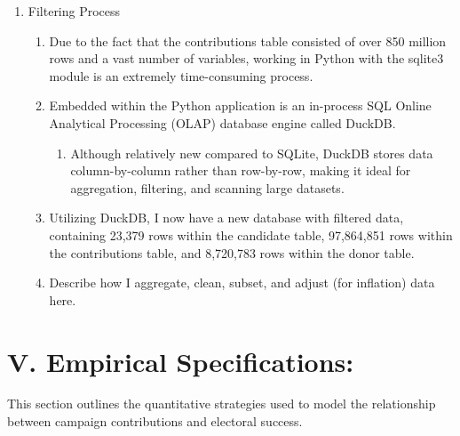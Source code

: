 \documentclass[12pt]{article}
\begin{document}
\begin{enumerate}[label=\Alph*.]
    \item Filtering Process
    \begin{enumerate}[label=\arabic*)]
        \item Due to the fact that the contributions table consisted of over 850 million rows and a vast number of variables, working in Python with the sqlite3 module is an extremely time-consuming process.
        \item Embedded within the Python application is an in-process SQL Online Analytical Processing (OLAP) database engine called DuckDB.
        \begin{enumerate}[label=\alph*)]
            \item Although relatively new compared to SQLite, DuckDB stores data column-by-column rather than row-by-row, making it ideal for aggregation, filtering, and scanning large datasets.
        \end{enumerate}
        \item Utilizing DuckDB, I now have a new database with filtered data, containing 23,379 rows within the candidate table, 97,864,851 rows within the contributions table, and 8,720,783 rows within the donor table.
        \item Describe how I aggregate, clean, subset, and adjust (for inflation) data here.
    \end{enumerate}
  \end{enumerate}

\section*{V. Empirical Specifications:} This section outlines the quantitative strategies used to model the relationship between campaign contributions and electoral success.
\end{document}
